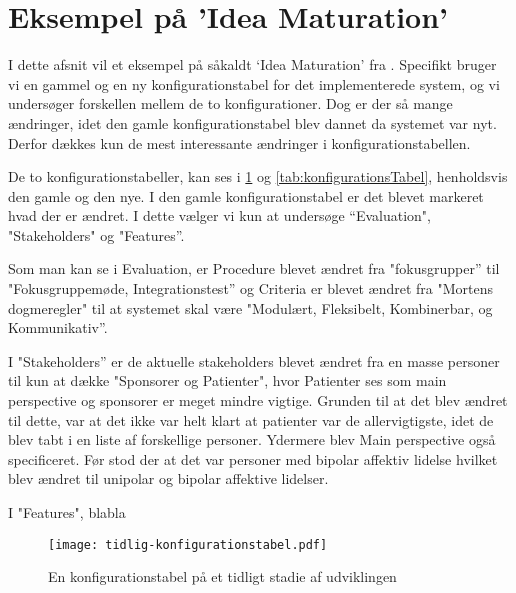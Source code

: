 \section{Eksempel på 'Idea Maturation'}
I dette afsnit vil et eksempel på såkaldt `Idea Maturation' fra \citet[Kapitel 23]{art:essence}.
Specifikt bruger vi en gammel og en ny konfigurationstabel for det implementerede system, og vi undersøger forskellen mellem de to konfigurationer.
Dog er der så mange ændringer, idet den gamle konfigurationstabel blev dannet da systemet var nyt. 
Derfor dækkes kun de mest interessante ændringer i konfigurationstabellen.

De to konfigurationstabeller, kan ses i \cref{tab:tidligKonfigurationsTabel} og \cref{tab:konfigurationsTabel}, henholdsvis den gamle og den nye. 
I den gamle konfigurationstabel er det blevet markeret hvad der er ændret.
I dette vælger vi kun at undersøge ``Evaluation", "Stakeholders" og "Features''. 

Som man kan se i Evaluation, er Procedure blevet ændret fra "fokusgrupper'' til "Fokusgruppemøde, Integrationstest'' og Criteria er blevet ændret fra "Mortens dogmeregler" til at systemet skal være "Modulært, Fleksibelt, Kombinerbar, og Kommunikativ''. 

I "Stakeholders'' er de aktuelle stakeholders blevet ændret fra en masse personer til kun at dække "Sponsorer og Patienter", hvor Patienter ses som main perspective og sponsorer er meget mindre vigtige. 
Grunden til at det blev ændret til dette, var at det ikke var helt klart at patienter var de allervigtigste, idet de blev tabt i en liste af forskellige personer.
Ydermere blev Main perspective også specificeret.
Før stod der at det var personer med bipolar affektiv lidelse hvilket blev ændret til unipolar og bipolar affektive lidelser. 

I "Features", blabla

\begin{figure}
	\texttt{[image: tidlig-konfigurationstabel.pdf]}
	\caption{En konfigurationstabel på et tidligt stadie af udviklingen}
	\label{tab:tidligKonfigurationsTabel}
\end{figure}